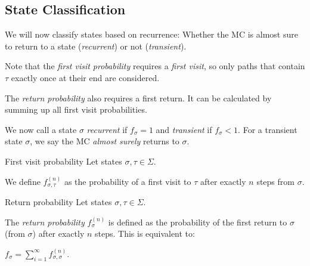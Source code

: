 \documentclass[english]{panikzettel}
\begin{document}
\subsection{State Classification}

\begin{halfboxl}
    We will now classify states based on recurrence: Whether the MC is almost sure to return to a state (\emph{recurrent}) or not (\emph{transient}).

    Note that the \emph{first visit probability} requires a \emph{first visit}, so only paths that contain $\tau$ exactly once at their end are considered.

    The \emph{return probability} also requires a first return.
    It can be calculated by summing up all first visit probabilities.

    We now call a state $\sigma$ \emph{recurrent} if $f_\sigma = 1$ and \emph{transient} if $f_\sigma < 1$.
    For a transient state $\sigma$, we say the MC \emph{almost surely} returns to $\sigma$.
\end{halfboxl}%
\begin{halfboxr}
    \vspace{-\baselineskip}
    \begin{defi}{First visit probability}
        Let states $\sigma, \tau \in \Sigma$.

        We define $f^{(n)}_{\sigma,\tau}$ as the probability of a first visit to $\tau$ after exactly $n$ steps from $\sigma$.
    \end{defi}

    \begin{defi}{Return probability}
        Let states $\sigma, \tau \in \Sigma$.

        The \emph{return probability} $f_\sigma^{(n)}$ is defined as the probability of the first return to $\sigma$ (from $\sigma$) after exactly $n$ steps.
        This is equivalent to:
        \begin{tightcenter}\large{}$f_\sigma = \sum_{i=1}^\infty f_{\sigma,\sigma}^{(n)}$.\end{tightcenter}
    \end{defi}
\end{halfboxr}
\end{document}
